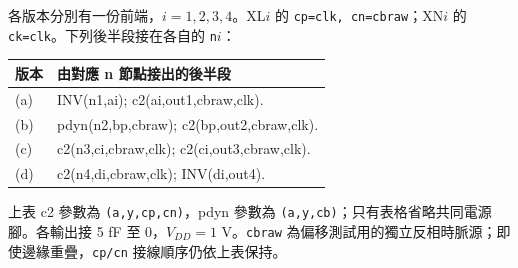 各版本分別有一份前端，\(i=1,2,3,4\)。XL\(i\) 的 \texttt{cp=clk, cn=cbraw}；XN\(i\) 的 \texttt{ck=clk}。下列後半段接在各自的 \texttt{n}\(i\)：
\begin{center}\small\begin{tabular}{p{.24\linewidth}p{.68\linewidth}}\toprule
版本 & 由對應 n 節點接出的後半段\\\midrule
(a) & INV(n1,ai); c2(ai,out1,cbraw,clk).\\
(b) & pdyn(n2,bp,cbraw); c2(bp,out2,cbraw,clk).\\
(c) & c2(n3,ci,cbraw,clk); c2(ci,out3,cbraw,clk).\\
(d) & c2(n4,di,cbraw,clk); INV(di,out4).\\
\bottomrule\end{tabular}\end{center}
上表 c2 參數為 \texttt{(a,y,cp,cn)}，pdyn 參數為 \texttt{(a,y,cb)}；只有表格省略共同電源腳。各輸出接 5 fF 至 0，\(V_{DD}=1\) V。\texttt{cbraw} 為偏移測試用的獨立反相時脈源；即使邊緣重疊，\texttt{cp/cn} 接線順序仍依上表保持。
\endgroup
